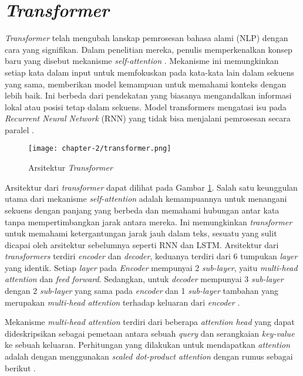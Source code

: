 \section{\textit{Transformer}}

\textit{Transformer} telah mengubah lanskap pemrosesan bahasa alami (NLP) dengan cara yang signifikan. Dalam penelitian mereka, penulis memperkenalkan konsep baru yang disebut mekanisme \textit{self-attention} \parencite{transformers}. Mekanisme ini memungkinkan setiap kata dalam input untuk memfokuskan pada kata-kata lain dalam sekuens yang sama, memberikan model kemampuan untuk memahami konteks dengan lebih baik. Ini berbeda dari pendekatan yang biasanya mengandalkan informasi lokal atau posisi tetap dalam sekuens. Model transformers mengatasi isu pada \textit{Recurrent Neural Network} (RNN) yang tidak bisa menjalani pemrosesan secara paralel \parencite{transformers}.

\begin{figure}[ht]
    \vspace{0.25cm}
    \centering
    \texttt{[image: chapter-2/transformer.png]}
    \caption{Arsitektur \textit{Transformer} \parencite{transformers}}
    \label{fig:transformer}
\end{figure}

Arsitektur dari \textit{transformer} dapat dilihat pada Gambar \ref{fig:transformer}. Salah satu keunggulan utama dari mekanisme \textit{self-attention} adalah kemampuannya untuk menangani sekuens dengan panjang yang berbeda dan memahami hubungan antar kata tanpa mempertimbangkan jarak antara mereka. Ini memungkinkan \textit{transformer} untuk memahami ketergantungan jarak jauh dalam teks, sesuatu yang sulit dicapai oleh arsitektur sebelumnya seperti RNN dan LSTM. Arsitektur dari \textit{transformers} terdiri \textit{encoder} dan \textit{decoder}, keduanya terdiri dari 6 tumpukan \textit{layer} yang identik. Setiap \textit{layer} pada \textit{Encoder} mempunyai 2 \textit{sub-layer}, yaitu \textit{multi-head attention} dan \textit{feed forward}. Sedangkan, untuk \textit{decoder} mempunyai 3 \textit{sub-layer} dengan 2 \textit{sub-layer} yang sama pada \textit{encoder} dan 1 \textit{sub-layer} tambahan yang merupakan \textit{multi-head attention} terhadap keluaran dari \textit{encoder} \parencite{transformers}.

Mekanisme \textit{multi-head attention} terdiri dari beberapa \textit{attention head} yang dapat dideskripsikan sebagai pemetaan antara sebuah \textit{query} dan serangkaian \textit{key-value} ke sebuah keluaran. Perhitungan yang dilakukan untuk mendapatkan \textit{attention} adalah dengan menggunakan \textit{scaled dot-product attention} dengan rumus sebagai berikut \parencite{transformers}.

